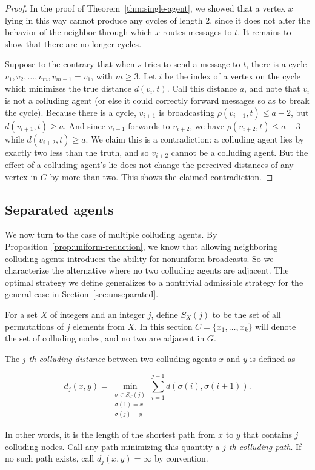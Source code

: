 \documentclass{comnet}
\begin{document}
\begin{proof}

In the proof of Theorem~\ref{thm:single-agent}, we showed that a vertex $x$
lying in this way cannot produce any cycles of length 2, since it does not
alter the behavior of the neighbor through which $x$ routes messages to $t$. It
remains to show that there are no longer cycles.

Suppose to the contrary that when $s$ tries to send a message to $t$, there is
a cycle $v_1, v_2, \dots, v_m, v_{m+1} = v_1$, with $m \geq 3$. Let $i$ be the
index of a vertex on the cycle which minimizes the true distance $d(v_i, t)$.
Call this distance $a$, and note that $v_i$ is not a colluding agent (or else
it could correctly forward messages so as to break the cycle). Because there is
a cycle, $v_{i+1}$ is broadcasting $\rho(v_{i+1}, t) \leq a-2$, but $d(v_{i+1},
t) \geq a$. And since $v_{i+1}$ forwards to $v_{i+2}$, we have $\rho(v_{i+2},
t) \leq a-3$ while $d(v_{i+2}, t) \geq a$. We claim this is a contradiction: a
colluding agent lies by exactly two less than the truth, and so $v_{i+2}$
cannot be a colluding agent. But the effect of a colluding agent's lie does not
change the perceived distances of any vertex in $G$ by more than two. This
shows the claimed contradiction.
\end{proof}

\subsection{Separated agents}\label{sec:separated}

We now turn to the case of multiple colluding agents. By
Proposition~\ref{prop:uniform-reduction}, we know that allowing neighboring
colluding agents introduces the ability for nonuniform broadcasts. So we
characterize the alternative where no two colluding agents are adjacent. The
optimal strategy we define generalizes to a nontrivial admissible strategy for
the general case in Section~\ref{sec:unseparated}.

For a set $X$ of integers and an integer $j$, define $S_X(j)$ to be the set of all
permutations of $j$ elements from $X$. In this section $C = \{ x_1, \dots, x_k
\}$ will denote the set of colluding nodes, and no two are adjacent in $G$.

\begin{definition}
The \emph{$j$-th colluding distance} between two colluding agents $x$ and $y$
is defined as

\[
   d_j(x, y)= \min_{\substack{\sigma \in S_C(j) \\ \sigma(1) = x \\ \sigma(j) =
y}}
         \sum_{i=1}^{j-1} d(\sigma(i),\sigma(i+1)).
\]

In other words, it is the length of the shortest path from $x$ to $y$ that
contains $j$ colluding nodes. Call any path minimizing this quantity a
\emph{$j$-th colluding path}. If no such path exists, call $d_j(x,y) = \infty$
by convention.  \end{definition}
\end{document}
